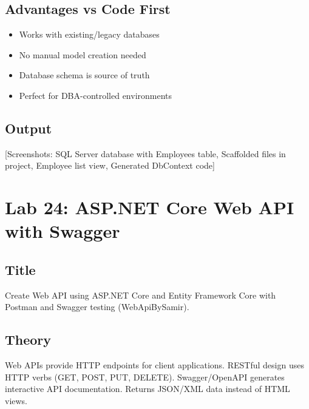 \documentclass[10pt,a4paper]{article}
\begin{document}
\subsection*{Advantages vs Code First}
\begin{itemize}
    \item Works with existing/legacy databases
    \item No manual model creation needed
    \item Database schema is source of truth
    \item Perfect for DBA-controlled environments
\end{itemize}

\subsection*{Output}
[Screenshots: SQL Server database with Employees table, Scaffolded files in project, Employee list view, Generated DbContext code]

\newpage

\section*{Lab 24: ASP.NET Core Web API with Swagger}

\subsection*{Title}
Create Web API using ASP.NET Core and Entity Framework Core with Postman and Swagger testing (WebApiBySamir).

\subsection*{Theory}
Web APIs provide HTTP endpoints for client applications. RESTful design uses HTTP verbs (GET, POST, PUT, DELETE). Swagger/OpenAPI generates interactive API documentation. Returns JSON/XML data instead of HTML views.
\end{document}
